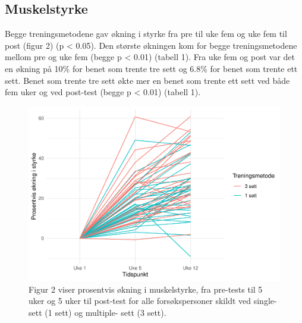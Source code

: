 \documentclass[
]{book}
\begin{document}
\hypertarget{muskelstyrke}{%
\subsection{Muskelstyrke}\label{muskelstyrke}}

Begge treningsmetodene gav økning i styrke fra pre til uke fem og uke fem til post (figur 2) (p \textless{} 0.05). Den største økningen kom for begge treningsmetodene mellom pre og uke fem (begge p \textless{} 0.01) (tabell 1). Fra uke fem og post var det en økning på 10\% for benet som trente tre sett og 6.8\% for benet som trente ett sett. Benet som trente tre sett økte mer en benet som trente ett sett ved både fem uker og ved post-test (begge p \textless{} 0.01) (tabell 1).

\begin{figure}
\centering
\includegraphics{_main_files/figure-latex/styrkefigur-1.pdf}
\caption{\label{fig:styrkefigur}Figur 2 viser prosentvis økning i muskelstyrke, fra pre-tests til 5 uker og 5 uker til post-test for alle forsøkspersoner skildt ved single- sett (1 sett) og multiple- sett (3 sett).}
\end{figure}

\providecommand{\docline}[3]{\noalign{\global\setlength{\arrayrulewidth}{#1}}\arrayrulecolor[HTML]{#2}\cline{#3}}

\setlength{\tabcolsep}{2pt}

\renewcommand*{\arraystretch}{1.5}
\end{document}
